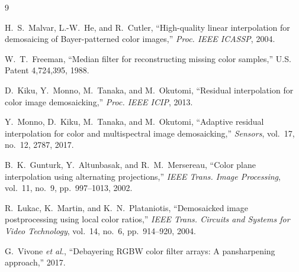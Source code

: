 \documentclass[10pt,a4paper]{article}
\begin{document}
\begin{thebibliography}{9}

H.~S.~Malvar, L.-W.~He, and R.~Cutler,
``High-quality linear interpolation for demosaicing of Bayer-patterned color
images,''
\emph{Proc. IEEE ICASSP}, 2004.

W.~T.~Freeman,
``Median filter for reconstructing missing color samples,''
U.S. Patent 4,724,395, 1988.

D.~Kiku, Y.~Monno, M.~Tanaka, and M.~Okutomi,
``Residual interpolation for color image demosaicking,''
\emph{Proc. IEEE ICIP}, 2013.

Y.~Monno, D.~Kiku, M.~Tanaka, and M.~Okutomi,
``Adaptive residual interpolation for color and multispectral image
demosaicking,''
\emph{Sensors}, vol.~17, no.~12, 2787, 2017.

B.~K.~Gunturk, Y.~Altunbasak, and R.~M.~Mersereau,
``Color plane interpolation using alternating projections,''
\emph{IEEE Trans. Image Processing}, vol.~11, no.~9, pp.~997--1013, 2002.

R.~Lukac, K.~Martin, and K.~N.~Plataniotis,
``Demosaicked image postprocessing using local color ratios,''
\emph{IEEE Trans. Circuits and Systems for Video Technology}, vol.~14, no.~6,
pp.~914--920, 2004.

G.~Vivone \emph{et al.},
``Debayering RGBW color filter arrays: A pansharpening approach,''
2017.

\end{thebibliography}
\end{document}
